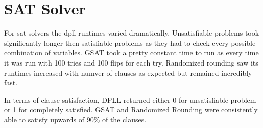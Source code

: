 \documentclass{article}
\begin{document}
\section*{SAT Solver}
For sat solvers the dpll runtimes varied dramatically. Unsatisfiable problems took significantly longer then satisfiable problems as they had to check every possible combination of variables. GSAT took a pretty constant time to run as every time it was run with 100 tries and 100 flips for each try. Randomized rounding saw its runtimes increased with numver of clauses as expected but remained incredibly fast.

In terms of clause satisfaction, DPLL returned either 0 for unsatisfiable problem or 1 for completely satisfied. GSAT and Randomized Rounding were consistently able to satisfy upwards of 90\% of the clauses.
\end{document}
